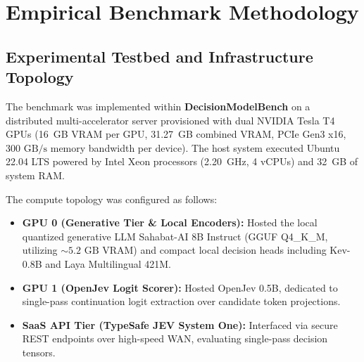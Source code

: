 \documentclass[journal,compsoc]{IEEEtran}
\begin{document}
\section{Empirical Benchmark Methodology}

\subsection{Experimental Testbed and Infrastructure Topology}
The benchmark was implemented within \textbf{DecisionModelBench} on a distributed multi-accelerator server provisioned with dual NVIDIA Tesla T4 GPUs (16~GB VRAM per GPU, 31.27~GB combined VRAM, PCIe Gen3 x16, $300 \text{ GB/s}$ memory bandwidth per device). The host system executed Ubuntu 22.04 LTS powered by Intel Xeon processors (2.20~GHz, 4 vCPUs) and 32~GB of system RAM.

The compute topology was configured as follows:
\begin{itemize}
    \item \textbf{GPU 0 (Generative Tier \& Local Encoders):} Hosted the local quantized generative LLM Sahabat-AI 8B Instruct (GGUF Q4\_K\_M, utilizing $\sim 5.2 \text{ GB}$ VRAM) and compact local decision heads including Kev-0.8B and Laya Multilingual 421M.
    \item \textbf{GPU 1 (OpenJev Logit Scorer):} Hosted OpenJev 0.5B, dedicated to single-pass continuation logit extraction over candidate token projections.
    \item \textbf{SaaS API Tier (TypeSafe JEV System One):} Interfaced via secure REST endpoints over high-speed WAN, evaluating single-pass decision tensors.
\end{itemize}
\end{document}
